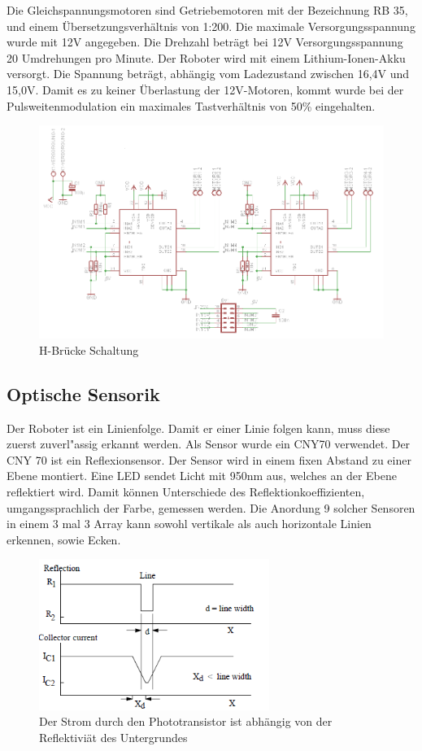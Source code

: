 \documentclass[a4paper,bibtotoc,oneside]{scrbook}
\begin{document}
Die Gleichspannungsmotoren sind Getriebemotoren mit der Bezeichnung RB 35, und einem Übersetzungsverhältnis von 1:200. Die maximale Versorgungsspannung wurde mit 12V angegeben. Die Drehzahl beträgt bei 12V Versorgungsspannung 20 Umdrehungen pro Minute.
Der Roboter wird mit einem Lithium-Ionen-Akku versorgt. Die Spannung beträgt, abhängig vom Ladezustand zwischen 16,4V und 15,0V. Damit es zu keiner Überlastung der 12V-Motoren, kommt wurde bei der Pulsweitenmodulation ein maximales Tastverhältnis von 50\% eingehalten.

\begin{figure}[htbp]
\centering
\includegraphics[width=150mm]{img/HBrucke.png}
\caption[H-Brücke Schaltung]{H-Brücke Schaltung}\label{hbridge2}
\end{figure}


\subsection{Optische Sensorik}\thispagestyle{empty}
Der Roboter ist ein Linienfolge. Damit er einer Linie folgen kann, muss diese zuerst zuverl"assig erkannt werden. 
Als Sensor wurde ein CNY70 verwendet. Der CNY 70 ist ein Reflexionsensor. Der Sensor wird in einem fixen Abstand zu einer Ebene montiert. Eine LED sendet Licht mit 950nm aus, welches an der Ebene reflektiert wird. Damit können Unterschiede des Reflektionkoeffizienten, umgangssprachlich der Farbe, gemessen werden. Die Anordung 9 solcher Sensoren in einem 3 mal 3 Array kann sowohl vertikale als auch horizontale Linien erkennen, sowie Ecken.

\begin{figure}[htbp]
\centering
\includegraphics[width=75mm]{img/cny70.png}
\caption{Der Strom durch den Phototransistor ist abhängig von der Reflektiviät des Untergrundes}\label{cny1}
\end{figure}
\end{document}

